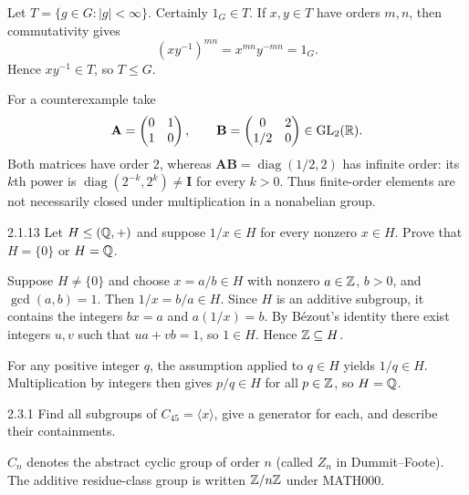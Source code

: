 \documentclass[11pt,oneside]{article}
\begin{document}
\begin{solution}
Let $T=\{g\in G:|g|<\infty\}$. Certainly $1_G\in T$. If $x,y\in T$ have orders $m,n$, then commutativity gives
\[
 (xy^{-1})^{mn}=x^{mn}y^{-mn}=1_G.
\]
Hence $xy^{-1}\in T$, so $T\le G$.

For a counterexample take
\[
\mathbf A=\begin{pmatrix}0&1\\1&0\end{pmatrix},\qquad
\mathbf B=\begin{pmatrix}0&2\\1/2&0\end{pmatrix}\in\operatorname{GL}_2(\mathbb{R}).
\]
Both matrices have order $2$, whereas $\mathbf A\mathbf B=\operatorname{diag}(1/2,2)$ has infinite order: its $k$th power is $\operatorname{diag}(2^{-k},2^k)\ne\mathbf I$ for every $k>0$. Thus finite-order elements are not necessarily closed under multiplication in a nonabelian group.
\end{solution}

\begin{exercise}{2.1.13}
Let $H\le(\mathbb{Q},+)$ and suppose $1/x\in H$ for every nonzero $x\in H$. Prove that $H=\{0\}$ or $H=\mathbb{Q}$.
\end{exercise}

\begin{solution}
Suppose $H\ne\{0\}$ and choose $x=a/b\in H$ with nonzero $a\in\mathbb{Z}$, $b>0$, and $\gcd(a,b)=1$. Then $1/x=b/a\in H$. Since $H$ is an additive subgroup, it contains the integers $bx=a$ and $a(1/x)=b$. By B\'ezout's identity there exist integers $u,v$ such that $ua+vb=1$, so $1\in H$. Hence $\mathbb{Z}\subseteq H$.

For any positive integer $q$, the assumption applied to $q\in H$ yields $1/q\in H$. Multiplication by integers then gives $p/q\in H$ for all $p\in\mathbb{Z}$, so $H=\mathbb{Q}$.
\end{solution}

\begin{exercise}{2.3.1}
Find all subgroups of $C_{45}=\langle x\rangle$, give a generator for each, and describe their containments.
\end{exercise}

\begin{notation}
$C_n$ denotes the abstract cyclic group of order $n$ (called $Z_n$ in Dummit--Foote). The additive residue-class group is written $\mathbb{Z}/n\mathbb{Z}$ under MATH000.
\end{notation}
\end{document}
